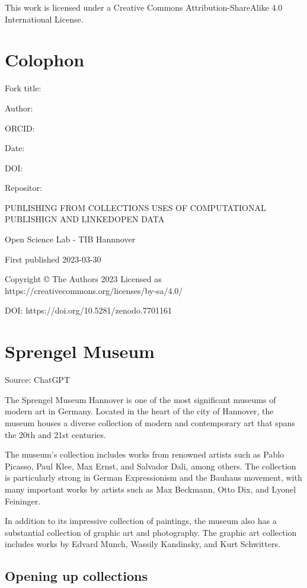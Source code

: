 \documentclass[
  letterpaper,
]{book}
\begin{document}
This work is licensed under a Creative Commons Attribution-ShareAlike
4.0 International License.


\hypertarget{colophon}{%
\chapter{Colophon}\label{colophon}}

Fork title:

Author:

ORCID:

Date:

DOI:

Repositor:

PUBLISHING FROM COLLECTIONS USES OF COMPUTATIONAL PUBLISHIGN AND
LINKEDOPEN DATA

Open Science Lab - TIB Hannnover

First published 2023-03-30

Copyright © The Authors 2023 Licensed as
https://creativecommons.org/licenses/by-sa/4.0/

DOI: https://doi.org/10.5281/zenodo.7701161


\hypertarget{sprengel-museum}{%
\chapter{Sprengel Museum}\label{sprengel-museum}}

Source: ChatGPT

The Sprengel Museum Hannover is one of the most significant museums of
modern art in Germany. Located in the heart of the city of Hannover, the
museum houses a diverse collection of modern and contemporary art that
spans the 20th and 21st centuries.

The museum's collection includes works from renowned artists such as
Pablo Picasso, Paul Klee, Max Ernst, and Salvador Dali, among others.
The collection is particularly strong in German Expressionism and the
Bauhaus movement, with many important works by artists such as Max
Beckmann, Otto Dix, and Lyonel Feininger.

In addition to its impressive collection of paintings, the museum also
has a substantial collection of graphic art and photography. The graphic
art collection includes works by Edvard Munch, Wassily Kandinsky, and
Kurt Schwitters.

\hypertarget{opening-up-collections}{%
\section{Opening up collections}\label{opening-up-collections}}
\end{document}
